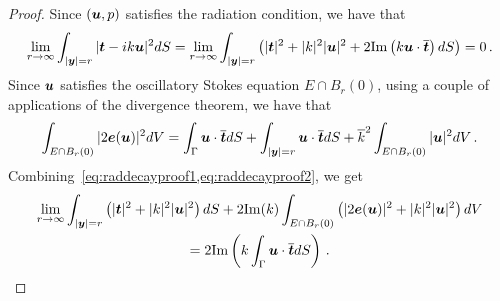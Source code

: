 \begin{proof}
Since $({\boldsymbol u},p)$ satisfies the radiation condition, we have that
\begin{equation}
\lim_{r\to\infty} \int_{|{\boldsymbol y}|=r} | {\boldsymbol t} - i k {\boldsymbol u}|^2 dS = 
\lim_{r\to\infty} \int_{|{\boldsymbol y}| =r} \left( |{\boldsymbol t}|^2 + |k|^2|{\boldsymbol u}|^2 + 2 {\textrm{\textup{Im}}} 
\left( k {\boldsymbol u}\cdot \overline{{\boldsymbol t}} \right) dS \label{eq:raddecayproof1}
\right) = 0 \, . 
\end{equation}
Since ${\boldsymbol u}$ satisfies the oscillatory Stokes equation $E \cap B_{r}(0)$,
using a couple of applications of the divergence theorem, we have that
\begin{equation}
\int_{E\cap B_{r}(0)} |2 {\boldsymbol e}({\boldsymbol u})|^2 dV =
\int_{\Gamma} {\boldsymbol u} \cdot \overline{{\boldsymbol t}} dS
+ \int_{|{\boldsymbol y}|=r} {\boldsymbol u} \cdot \overline{{\boldsymbol t}} dS + \overline{k}^2 
\int_{E \cap B_{r}(0)} |{\boldsymbol u}|^2 dV \,. \label{eq:raddecayproof2}
\end{equation}
Combining~\cref{eq:raddecayproof1,eq:raddecayproof2}, we get
\begin{multline*}
\lim_{r\to\infty} \int_{|{\boldsymbol y}|=r}\left(|{\boldsymbol t}|^2 + |k|^2 |{\boldsymbol u}|^2 \right) dS 
+ 2 {\textrm{\textup{Im}}}(k)\int_{E \cap B_{r}(0)} \left(|2{\boldsymbol e}({\boldsymbol u})|^2 + |k|^2 |{\boldsymbol u}|^2 
\right) dV \\
= 2{\textrm{\textup{Im}}} \left ( k \int_{\Gamma} {\boldsymbol u} \cdot \overline{{\boldsymbol t}} dS \right) \, .
\end{multline*}
\end{proof}

